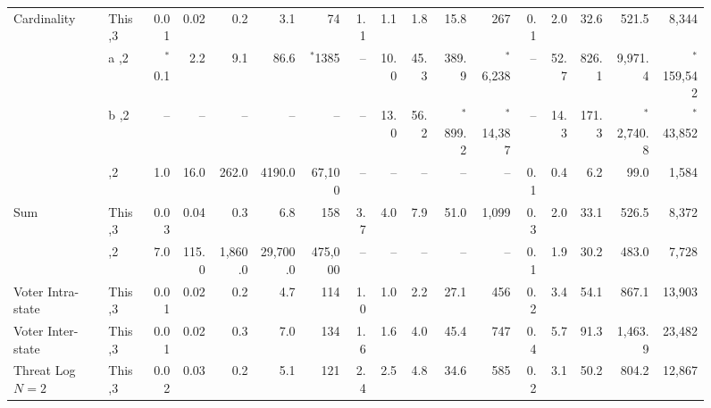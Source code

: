 \begin{figure*}[t!]
\begin{tabular}{|l |l|| r | r |r |r|r||r | r |r |r|r||r|r|r|r|r|}
	\multirow{3}{*}{Cardinality}  & This                          \hfill ,3      & 0.01    & 0.02     & 0.2      & 3.1         &         74 &   1.1 & 1.1      & 1.8      & 15.8      &        267 &   0.1 &      2.0 &     32.6 &       521.5 &       8,344 \\ \cline{2-17}
	                              & \cite{PSWW18}a                     \hfill ,2 & $^*$0.1 & 2.2      & 9.1      & 86.6        &   $^*$1385 &    -- & 10.0     & 45.3     & 389.9     &  $^*$6,238 &    -- &     52.7 &    826.1 &     9,971.4 & $^*$159,542 \\ \cline{2-17}
	                              & \cite{PSWW18}b                      \hfill,2 & --      & --       & --       & --          &         -- &    -- & 13.0     & 56.2     & $^*$899.2 & $^*$14,387 &    -- &     14.3 &    171.3 & $^*$2,740.8 &  $^*$43,852 \\ \cline{2-17}
	                              & \cite{DBLP:conf/cans/CristofaroGT12}\hfill,2 & 1.0     & 16.0     & 262.0    & 4190.0      &     67,100 &    -- & --       & --       & --        &           -- &   0.1 &      0.4 &      6.2 &        99.0 &       1,584 \\ \hline\hline
	\multirow{2}{*}{Sum}          & This                           \hfill ,3     & 0.03    & 0.04     & 0.3      & 6.8         &        158 &   3.7 & 4.0      & 7.9      & 51.0      &      1,099 &   0.3 &      2.0 &     33.1 &       526.5 &       8,372 \\ \cline{2-17}
	                              & \cite{cryptoeprint:2017:738}    \hfill ,2    & 7.0     & 115.0    & 1,860.0  & 29,700.0    &    475,000 &    -- & --       & --       & --        &           -- &   0.1 &      1.9 &     30.2 &       483.0 &       7,728 \\ \hline
	Voter Intra-state             & This                          \hfill ,3      & 0.01    & 0.02     & 0.2      & 4.7         &        114 &   1.0 & 1.0      & 2.2      & 27.1      &        456 &   0.2 &      3.4 &     54.1 &       867.1 &      13,903 \\ \hline
	Voter Inter-state             & This                         \hfill ,3       & 0.01    & 0.02     & 0.3      & 7.0         &        134 &   1.6 & 1.6      & 4.0      & 45.4      &        747 &   0.4 &      5.7 &     91.3 &     1,463.9 &      23,482 \\ \hline
	Threat Log $N=2$              & This                         \hfill ,3       & 0.02    & 0.03     & 0.2      & 5.1         &        121 &   2.4 & 2.5      & 4.8      & 34.6      &        585 &   0.2 &      3.1 &     50.2 &       804.2 &      12,867 \\ \hline

\end{tabular}
\end{figure*}
